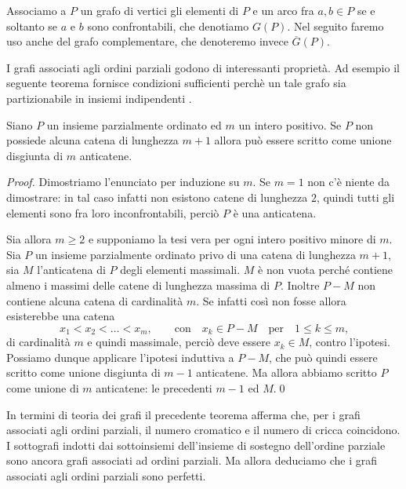Associamo a \(P\) un grafo di vertici gli elementi di \(P\) e un arco fra \(a\text{,}\,b\in P\) se e soltanto se \(a\) e \(b\) sono confrontabili, che denotiamo \(G(P)\). Nel seguito faremo uso anche del grafo complementare, che denoteremo invece \(\overline{G}(P)\).

I grafi associati agli ordini parziali godono di interessanti proprietà. Ad esempio il seguente teorema fornisce condizioni sufficienti perchè un tale grafo sia partizionabile in insiemi indipendenti \cite{Mirsky1971}.
\begin{theorem}
  [Mirsky] \label{mirskytheorem} Siano \(P\) un insieme parzialmente ordinato ed \(m\) un intero positivo. Se \(P\) non possiede alcuna catena di lunghezza \(m+1\) allora può essere scritto come unione disgiunta di \(m\) anticatene. 
\end{theorem}
\begin{proof}
  Dimostriamo l'enunciato per induzione su \(m\). Se \(m=1\) non c'è niente da dimostrare: in tal caso infatti non esistono catene di lunghezza \(2\), quindi tutti gli elementi sono fra loro inconfrontabili, perciò \(P\) è una anticatena. 
  
  Sia allora \(m\ge 2\) e supponiamo la tesi vera per ogni intero positivo minore di \(m\). Sia \(P\) un insieme parzialmente ordinato privo di una catena di lunghezza \(m+1\), sia \(M\) l'anticatena di \(P\) degli elementi massimali. \(M\) è non vuota perché contiene almeno i massimi delle catene di lunghezza massima di \(P\). Inoltre \(P-M\) non contiene alcuna catena di cardinalità \(m\). Se infatti così non fosse allora esisterebbe una catena
  \[
    x_1 < x_2 < \dots < x_m,  \qquad\text{con}\quad x_k \in P-M\quad\text{per}\quad 1\le k \le m\text{,}
  \]
  di cardinalità \(m\) e quindi massimale, perciò deve essere \(x_k\in M\), contro l'ipotesi. Possiamo dunque applicare l'ipotesi induttiva a \(P-M\), che può quindi essere scritto come unione disgiunta di \(m-1\) anticatene. Ma allora abbiamo scritto \(P\) come unione di \(m\) anticatene: le precedenti \(m-1\) ed \(M\).\qed
\end{proof}

In termini di teoria dei grafi il precedente teorema afferma che, per i grafi associati agli ordini parziali, il numero cromatico e il numero di cricca coincidono. I sottografi indotti dai sottoinsiemi dell'insieme di sostegno dell'ordine parziale sono ancora grafi associati ad ordini parziali. Ma allora deduciamo che i grafi associati agli ordini parziali sono perfetti.

